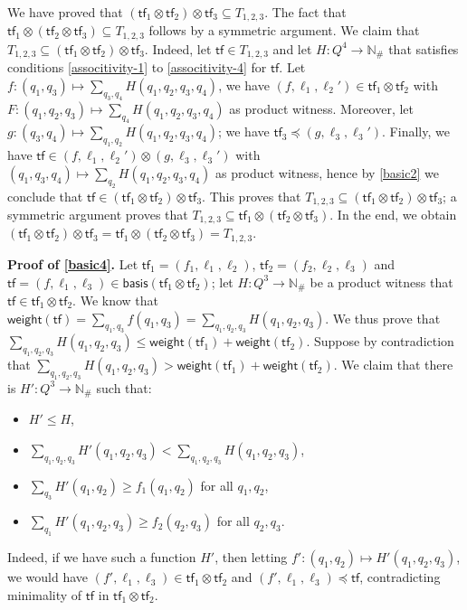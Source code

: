 \documentclass[10pt,a4paper]{article}
\let\mathbb\mathds
\renewcommand{\geq}{\geqslant}
\renewcommand{\leq}{\leqslant}
\newcommand{\nats}{\mathbb{N}}
\newcommand*{\states}{Q}
\newcommand*{\abuchistate}{\ell}
\newcommand*{\controlloc}{\abuchistate}
\newcommand*{\dummysymb}{\#}
\newcommand*{\natsanddummy}{\nats_{\dummysymb}}
\newcommand*{\tfweight}[1]{\mathsf{weight}(#1)}
\newcommand*{\minwqo}[1]{\mathsf{basis}(#1)}
\newcommand*{\atf}{\mathsf{tf}}
\newcommand*{\tftimes}{\otimes}
\newcommand*{\letf}{\preceq}
\begin{document}
\begin{appendixproof}
	We have proved that \((\atf_1 \tftimes \atf_2) \tftimes \atf_3 \subseteq T_{1,2,3}\).
	The fact that \(\atf_1 \tftimes (\atf_2 \tftimes \atf_3) \subseteq T_{1,2,3}\) follows by a symmetric argument.
	We claim that \(T_{1,2,3} \subseteq (\atf_1 \tftimes \atf_2) \tftimes \atf_3\).
	Indeed, let \(\atf \in T_{1,2,3}\) and let \(H: \states^4 \to \natsanddummy\) that satisfies conditions \ref{associtivity-1} to \ref{associtivity-4} for \(\atf\).
	Let \(f : (q_1,q_3) \mapsto \sum_{q_3,q_4} H(q_1,q_2,q_3,q_4)\), we have \((f,\controlloc_1,\controlloc_2') \in \atf_1 \tftimes \atf_2\) with \(F: (q_1,q_2,q_3) \mapsto \sum_{q_4} H(q_1,q_2,q_3,q_4)\) as product witness.
	Moreover, let \(g: (q_3,q_4) \mapsto \sum_{q_1,q_2} H(q_1,q_2,q_3,q_4)\); we have \(\atf_3 \letf (g,\controlloc_3, \controlloc_3')\).
	Finally, we have \(\atf \in (f,\controlloc_1, \controlloc_2') \tftimes (g,\controlloc_3, \controlloc_3')\) with \((q_1,q_3,q_4) \mapsto \sum_{q_2} H(q_1,q_2,q_3,q_4)\) as product witness, hence by \ref{basic2} we conclude that \(\atf \in (\atf_1 \tftimes \atf_2) \tftimes \atf_3\).
	This proves that \(T_{1,2,3} \subseteq (\atf_1 \tftimes \atf_2) \tftimes \atf_3\); a symmetric argument proves that \(T_{1,2,3} \subseteq \atf_1 \tftimes (\atf_2 \tftimes \atf_3)\).
	In the end, we obtain \((\atf_1 \tftimes \atf_2) \tftimes \atf_3 = \atf_1 \tftimes (\atf_2 \tftimes \atf_3) = T_{1,2,3}\).

	\textbf{Proof of \ref{basic4}.}
	Let \(\atf_1 = (f_1, \controlloc_1, \controlloc_2)\), \(\atf_2 = (f_2, \controlloc_2, \controlloc_3)\) and \(\atf= (f,\controlloc_1, \controlloc_3) \in \minwqo{\atf_1 \tftimes \atf_2}\); let \(H : \states^3 \to \natsanddummy\) be a product witness that \(\atf \in \atf_1 \tftimes \atf_2\).
	We know that \(\tfweight{\atf} = \sum_{q_1,q_3} f(q_1,q_3) = \sum_{q_1,q_2,q_3} H(q_1,q_2,q_3)\).
	We thus prove that \(\sum_{q_1,q_2,q_3} H(q_1,q_2,q_3) \leq \tfweight{\atf_1} + \tfweight{\atf_2}\).
	Suppose by contradiction that \(\sum_{q_1,q_2,q_3} H(q_1,q_2,q_3) > \tfweight{\atf_1} + \tfweight{\atf_2}\).
	We claim that there is \(H': \states^3 \to \natsanddummy\) such that:
	\begin{itemize}[noitemsep,topsep=0pt,parsep=0pt,partopsep=0pt]
		\item \(H' \leq H\),
		\item \(\sum_{q_1,q_2,q_3}
		      H'(q_1,q_2,q_3) < \sum_{q_1,q_2,q_3} H(q_1,q_2,q_3)\), \item \(\sum_{q_3} H'(q_1,q_2) \geq f_1(q_1,q_2)\) for all \(q_1,q_2\), \item \(\sum_{q_1} H'(q_1,q_2,q_3) \geq f_{2}(q_2,q_3)\) for all \(q_2,q_3\).
	\end{itemize}
	Indeed, if we have such a function \(H'\), then letting \(f' : (q_1,q_2) \mapsto H'(q_1,q_2,q_3)\), we would have \((f', \controlloc_1, \controlloc_3) \in \atf_1 \tftimes \atf_2\) and \((f', \controlloc_1, \controlloc_3) \letf \atf\), contradicting minimality of \(\atf\) in \(\atf_1 \tftimes \atf_2\).


\end{appendixproof}
\end{document}
